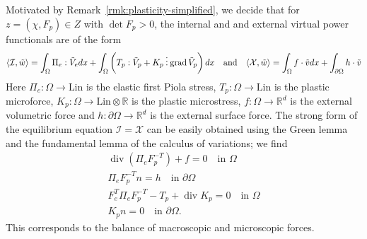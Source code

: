 \documentclass[a4paper,10pt,twoside]{amsbook}
\numberwithin{section}{chapter}
\numberwithin{equation}{chapter}
\theoremstyle{definition}
\DeclareMathOperator{\diver}{div}
\DeclareMathOperator{\grad}{grad}
\DeclarePairedDelimiter{\dual}{\langle}{\rangle}
\newcommand{\threedots}{\mathbin{\vdots}}
\begin{document}
Motivated by Remark~\ref{rmk:plasticity-simplified}, we decide that for $z=(\chi,F_p)\in Z$ with $\det F_p>0$, the internal and and external virtual power functionals are of the form
\begin{equation}
\label{eqn:ppv-large-plasticity}
\dual{\mathcal{I},\tilde w}=\int_\Omega \Pi_e:\tilde V_edx+\int_\Omega\left(T_p:\tilde V_p+K_p\threedots\grad\tilde V_p\right)dx
\quad\text{and}\quad
\dual{\mathcal{X},\tilde w}=\int_\Omega f\cdot\tilde vdx+\int_{\partial\Omega}h\cdot\tilde v
\end{equation}
Here $\Pi_e\colon\Omega\to\text{Lin}$ is the elastic first Piola stress, $T_p\colon\Omega\to\text{Lin}$ is the plastic microforce, $K_p\colon\Omega\to\text{Lin}\otimes\mathbb{R}$ is the plastic microstress, $f\colon\Omega\to\mathbb{R}^d$ is the external volumetric force and $h\colon\partial\Omega\to\mathbb{R}^d$ is the external surface force. The strong form of the equilibrium equation $\mathcal{I}=\mathcal{X}$ can be easily obtained using the Green lemma and the fundamental lemma of the calculus of variations; we find
\begin{gather*}
\diver(\Pi_eF_p^{-T})+f=0\quad\text{in $\Omega$} \\
\Pi_eF_p^{-T}n=h\quad\text{in $\partial\Omega$} \\
F_e^T\Pi_eF_p^{-T}-T_p+\diver K_p=0\quad\text{in $\Omega$} \\
K_pn=0\quad\text{in $\partial\Omega$}.
\end{gather*}
This corresponds to the balance of macroscopic and microscopic forces.
\end{document}

